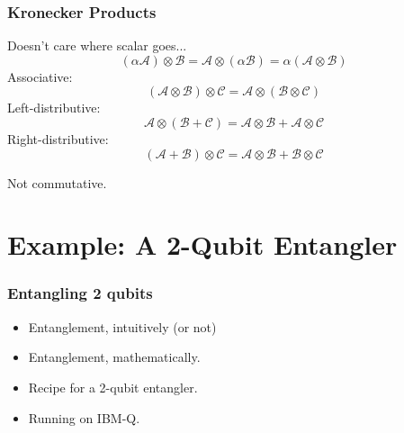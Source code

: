 \documentclass{beamer}
\theoremstyle{definition}
\newcommand{\A}{\mathcal{A}}
\newcommand{\B}{\mathcal{B}}
\begin{document}
\begin{frame}
\frametitle{Kronecker Products}
Doesn't care where scalar goes...
$$ (\alpha \A) \otimes \B = \A \otimes (\alpha \B) = \alpha(\A \otimes \B)$$
Associative: $$(\A \otimes \B) \otimes \mathcal{C} = \A \otimes (\B \otimes \mathcal{C})$$
Left-distributive: $$\A \otimes (\B + \mathcal{C}) = \A\otimes \B + \A \otimes \mathcal{C}$$
Right-distributive: $$(\A + \B)\otimes \mathcal{C} = \A \otimes \mathcal{B} + \B \otimes \mathcal{C}$$

Not commutative.
\end{frame}





%	




















\section{Example: A 2-Qubit Entangler}


\begin{frame}
\frametitle{Entangling 2 qubits}
\begin{itemize}
	\item Entanglement, intuitively (or not)
	\item Entanglement, mathematically. 
	\item Recipe for a 2-qubit entangler.
	\item Running on IBM-Q.
\end{itemize}
\end{frame}
\end{document}

